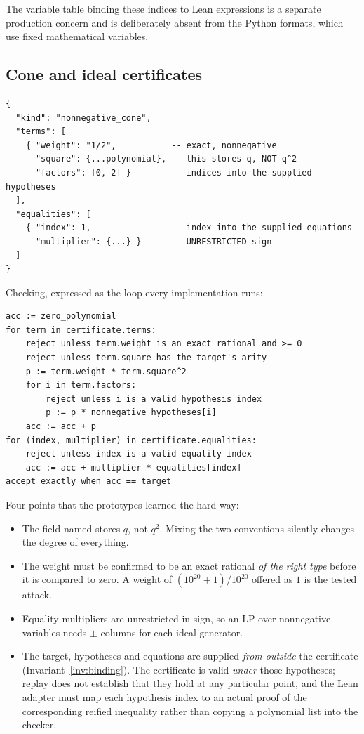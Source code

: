 The variable table binding these indices to Lean expressions is a separate
production concern and is deliberately absent from the Python formats, which use
fixed mathematical variables.

\subsection{Cone and ideal certificates}

\begin{lstlisting}
{
  "kind": "nonnegative_cone",
  "terms": [
    { "weight": "1/2",           -- exact, nonnegative
      "square": {...polynomial}, -- this stores q, NOT q^2
      "factors": [0, 2] }        -- indices into the supplied hypotheses
  ],
  "equalities": [
    { "index": 1,                -- index into the supplied equations
      "multiplier": {...} }      -- UNRESTRICTED sign
  ]
}
\end{lstlisting}

Checking, expressed as the loop every implementation runs:

\begin{lstlisting}
acc := zero_polynomial
for term in certificate.terms:
    reject unless term.weight is an exact rational and >= 0
    reject unless term.square has the target's arity
    p := term.weight * term.square^2
    for i in term.factors:
        reject unless i is a valid hypothesis index
        p := p * nonnegative_hypotheses[i]
    acc := acc + p
for (index, multiplier) in certificate.equalities:
    reject unless index is a valid equality index
    acc := acc + multiplier * equalities[index]
accept exactly when acc == target
\end{lstlisting}

Four points that the prototypes learned the hard way:

\begin{itemize}[leftmargin=1.4em]
\item The field named  stores $q$, not $q^2$. Mixing the two
  conventions silently changes the degree of everything.
\item The weight must be confirmed to be an exact rational \emph{of the right
  type} before it is compared to zero. A weight of $(10^{20}+1)/10^{20}$ offered
  as $1$ is the tested attack.
\item Equality multipliers are unrestricted in sign, so an LP over nonnegative
  variables needs $\pm$ columns for each ideal generator.
\item The target, hypotheses and equations are supplied \emph{from outside} the
  certificate (Invariant~\ref{inv:binding}). The certificate is valid
  \emph{under} those hypotheses; replay does not establish that they hold at any
  particular point, and the Lean adapter must map each hypothesis index to an
  actual proof of the corresponding reified inequality rather than copying a
  polynomial list into the checker.
\end{itemize}

